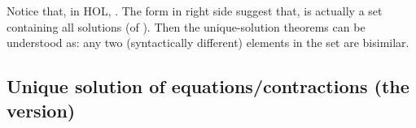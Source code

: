 Notice that, in HOL, . The form in right side suggest that,
 is actually a set containing all
solutions (of ). Then the unique-solution
theorems can be understood as: any two (syntactically different) elements
in the set are bisimilar.

\subsection{Unique solution of equations/contractions (the \multivariate version)}


